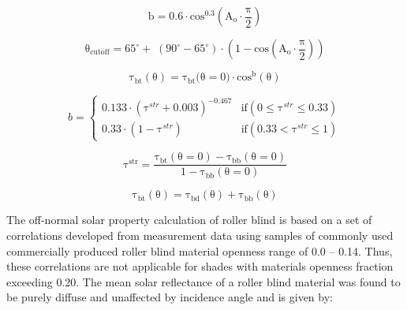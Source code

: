 {\begin{equation}
{\mathrm{b}} = {\mathrm{0}}{\mathrm{.6}} \cdot {\mathrm{co}}{{\mathrm{s}}^{{\mathrm{0}}{\mathrm{.3}}}}\left( {{{\mathrm{A}}_{\mathrm{o}}} \cdot \frac{{\mathrm{\pi }}}{{\mathrm{2}}}} \right)
\end{equation}

\begin{equation}
{{\mathrm{\theta }}_{{\mathrm{cutoff}}}} = {\mathrm{65}}^\circ  + \;\left( {{\mathrm{90}}^\circ  - {\mathrm{65}}^\circ } \right) \cdot \left( {{\mathrm{1}} - {\mathrm{cos}}\left( {{{\mathrm{A}}_{\mathrm{o}}} \cdot \frac{{\mathrm{\pi }}}{{\mathrm{2}}}} \right)} \right)
\end{equation}

\begin{equation}
{\mathrm{\tau }}_{{\mathrm{bt}}}^{}\left( {\mathrm{\theta }} \right) = {\mathrm{\tau }}_{{\mathrm{bt}}}^{}{\mathrm{(\theta }} = {\mathrm{0)}} \cdot {\mathrm{co}}{{\mathrm{s}}^{\mathrm{b}}} \left( {\mathrm{\theta }} \right)
\end{equation}

\begin{equation}
b = \left\{
    \begin{array}{lc}
      0.133 \cdot \left( \mathrm{\tau}^{str} + 0.003 \right)^{-0.467} &\text{if} \left( 0 \le \mathrm{\tau}^{str} \le 0.33 \right) \\
      0.33 \cdot \left( 1 - \mathrm{\tau}^{str} \right)               &\text{if} \left( 0.33 < \mathrm{\tau}^{str} \le 1 \right)
    \end{array}
  \right.
\end{equation}

\begin{equation}
{\mathrm{\tau }}_{}^{{\mathrm{str}}} = \frac{{{\mathrm{\tau }}_{{\mathrm{bt}}}^{}\left( {{\mathrm{\theta }} = {\mathrm{0}}} \right) - {{\mathrm{\tau }}_{{\mathrm{bb}}}}\left( {{\mathrm{\theta }} = {\mathrm{0}}} \right)}}{{{\mathrm{1}} - {{\mathrm{\tau }}_{{\mathrm{bb}}}}\left( {{\mathrm{\theta }} = {\mathrm{0}}} \right)}}
\end{equation}

\begin{equation}
{\mathrm{\tau_{bt}}}\left( {\mathrm{\theta }} \right) = {\mathrm{\tau_{bd}}}\left( {\mathrm{\theta }} \right) + {\mathrm{\tau_{bb}}}\left( {\mathrm{\theta }} \right)
\end{equation}

The off-normal solar property calculation of roller blind is based on a set of correlations developed from measurement data using samples of commonly used commercially produced roller blind material openness range of 0.0 -- 0.14. Thus, these correlations are not applicable for shades with materials openness fraction exceeding 0.20. The mean solar reflectance of a roller blind material was found to be purely diffuse and unaffected by incidence angle and is given by:

}
